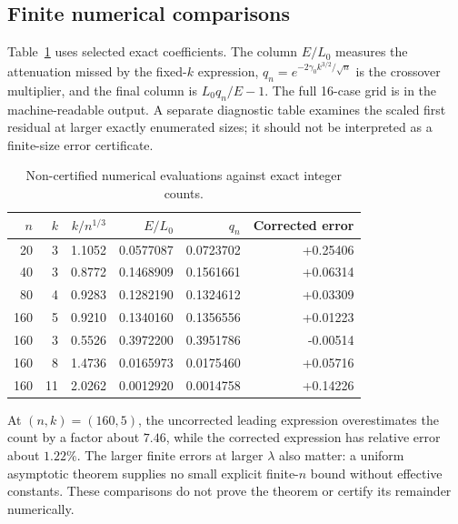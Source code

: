 \documentclass[11pt,letterpaper]{article}
\numberwithin{equation}{section}
\theoremstyle{definition}\newtheorem{definition}[theorem]{Definition}
\theoremstyle{remark}\newtheorem{remark}[theorem]{Remark}
\begin{document}
\subsection{Finite numerical comparisons}
Table~\ref{gal:cx:tab:checks} uses selected exact coefficients. The column $E/L_0$ measures the attenuation missed by the fixed-$k$ expression, $q_n=e^{-2\gamma_0k^{3/2}/\sqrt n}$ is the crossover multiplier, and the final column is $L_0q_n/E-1$. The full 16-case grid is in the machine-readable output. A separate diagnostic table examines the scaled first residual at larger exactly enumerated sizes; it should not be interpreted as a finite-size error certificate.
\par
\begin{table}[htbp]
\centering\small
\begin{tabular}{rrrrrr}
\toprule
$n$&$k$&$k/n^{1/3}$&$E/L_0$&$q_n$&Corrected error\\
\midrule
20 & 3 & 1.1052 & 0.0577087 & 0.0723702 & +0.25406 \\
40 & 3 & 0.8772 & 0.1468909 & 0.1561661 & +0.06314 \\
80 & 4 & 0.9283 & 0.1282190 & 0.1324612 & +0.03309 \\
160 & 5 & 0.9210 & 0.1340160 & 0.1356556 & +0.01223 \\
160 & 3 & 0.5526 & 0.3972200 & 0.3951786 & -0.00514 \\
160 & 8 & 1.4736 & 0.0165973 & 0.0175460 & +0.05716 \\
160 & 11 & 2.0262 & 0.0012920 & 0.0014758 & +0.14226 \\
\bottomrule
\end{tabular}
\caption{Non-certified numerical evaluations against exact integer counts.}\label{gal:cx:tab:checks}
\end{table}
\par
At $(n,k)=(160,5)$, the uncorrected leading expression overestimates the count by a factor about $7.46$, while the corrected expression has relative error about $1.22\%$. The larger finite errors at larger $\lambda$ also matter: a uniform asymptotic theorem supplies no small explicit finite-$n$ bound without effective constants. These comparisons do not prove the theorem or certify its remainder numerically.
\end{document}
